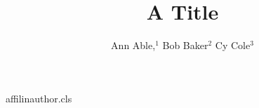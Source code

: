 \begin{filecontents*}[overwrite]{affilinauthor.cls}
\def\affilfont{\small}
\def\affil#1{\par{\reset@font\affilfont#1\par}}
\def\address#1{\par{\reset@font\affilfont#1\par}}
\def\@maketitle{\newpage{\Large\bfseries\@title\par}\vskip1em\noindent{\bfseries\@author\par}\vskip1em}
\end{filecontents*}
\documentclass{affilinauthor}
\usepackage{hyperref}

\title{A Title}
\author{Ann Able,$^1$ Bob Baker$^2$ Cy Cole$^3$
}
\maketitle
Body.

